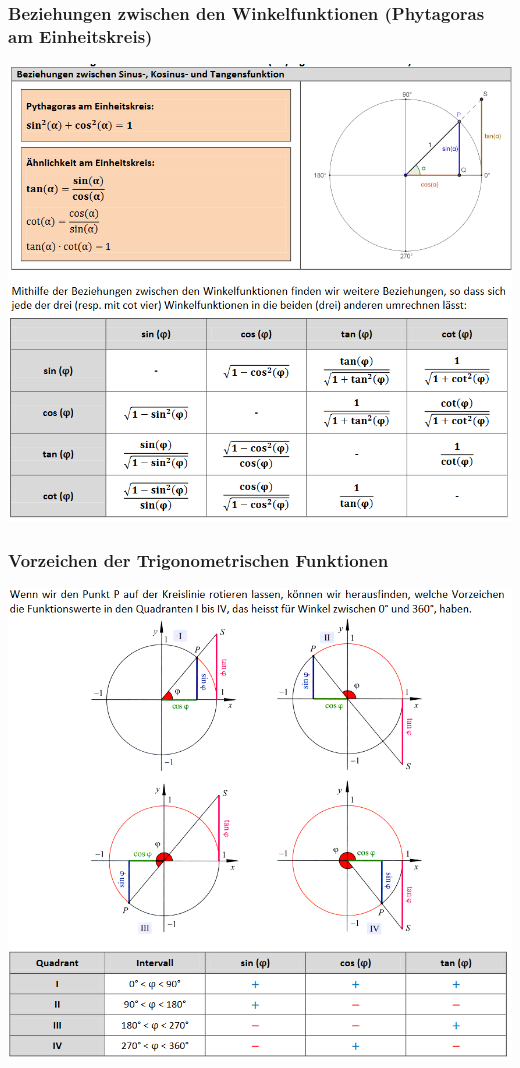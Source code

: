 \subsubsection{Beziehungen zwischen den Winkelfunktionen (Phytagoras am Einheitskreis)}
\includegraphics[scale=0.7]{einheitskreis3.PNG}
\subsubsection{Vorzeichen der Trigonometrischen Funktionen}
\includegraphics[scale=0.7]{einheitskreis4.PNG}

